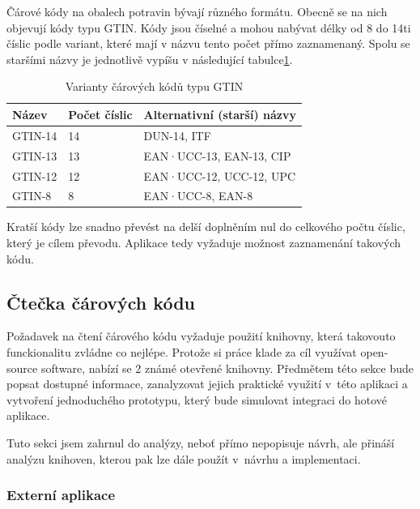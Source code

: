\documentclass[thesis=B,czech]{FITthesis}[2013/10/20]
\begin{document}
Čárové kódy na obalech potravin bývají různého formátu. Obecně se na nich objevují kódy typu GTIN. Kódy jsou číselné a mohou nabývat délky od 8 do 14ti číslic podle variant, které mají v názvu tento počet přímo zaznamenaný. Spolu se staršími názvy je jednotlivě vypíšu v následující tabulce\ref{table:carkod}.
\begin{table}[h]
      \begin{tabular}{|l|l|l|}
      \hline
      Název   & Počet číslic & Alternativní (starší) názvy \\ \hline
      GTIN-14 & 14           & DUN-14, ITF                 \\ \hline
      GTIN-13 & 13           & EAN·UCC-13, EAN-13, CIP     \\ \hline
      GTIN-12 & 12           & EAN·UCC-12, UCC-12, UPC     \\ \hline
      GTIN-8  & 8            & EAN·UCC-8, EAN-8            \\ \hline
      \end{tabular}
      \caption{Varianty čárových kódů typu GTIN}
      \label{table:carkod}
\end{table}
Kratší kódy lze snadno převést na delší doplněním nul do celkového počtu číslic, který je cílem převodu. Aplikace tedy vyžaduje možnost zaznamenání takových kódu.

\subsection{Čtečka čárových kódu}

Požadavek na čtení čárového kódu vyžaduje použití knihovny, která takovouto funckionalitu zvládne co nejlépe. Protože si práce klade za cíl využívat open-source software, nabízí se 2 známé otevřené knihovny. Předmětem této sekce bude popsat dostupné informace, zanalyzovat jejich praktické využití v~této aplikaci a vytvoření jednoduchého prototypu, který bude simulovat integraci do hotové aplikace.

Tuto sekci jsem zahrnul do analýzy, neboť přímo nepopisuje návrh, ale přináší analýzu knihoven, kterou pak lze dále použít v~návrhu a implementaci.

\subsubsection{Externí aplikace}
\end{document}
